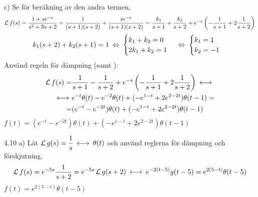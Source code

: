 \begin{task}{c)}
	Se  för beräkning av den andra termen.
	\[\operatorname{\mathcal{L}} f(s)=\frac{1+se^{-s}}{s^2+3s+2}=\frac{1}{(s+1)(s+2)}+\frac{se^{-s}}{(s+1)(s+2)}=\frac{k_1}{s+1}+\frac{k_2}{s+2}+e^{-s}\left(-\frac{1}{s+1}+2\frac{1}{s+2}\right)\]
	\[k_1(s+2)+k_2(s+1)=1\lra
	\begin{cases}
	k_1+k_2=0 \\
	2k_1+k_2=1
	\end{cases}\lra
	\begin{cases}
	k_1=1 \\
	k_2=-1
	\end{cases}\]
	Använd regeln för dämpning (samt ):
	\begin{align*}
	\laplace f(s)=
	&\frac{1}{s+1}-\frac{1}{s+2}+e^{-s}\left(-\frac{1}{s+1}+2\frac{1}{s+2}\right)\llra \\ \llra
	&e^{-t}\theta(t)-e^{-2}\theta(t)+(-e^{1-t}+2e^{2-2t})\theta(t-1)= \\ =
	&(e^{-t}-e^{-2t})\theta(t)+(-e^{1-t}+2e^{2-2t})\theta(t-1)
	\end{align*}
	\ans $f(t)=(e^{-t}-e^{-2t})\theta(t)+(-e^{1-t}+2e^{2-2t})\theta(t-1)$
\end{task}

\begin{task}{4.10 a)}
	Låt $\laplace g(s)=\dfrac{1}{s}\llra\theta(t)$ och använd reglerna för dämpning och förskjutning.
	\[\laplace f(s)=e^{-5s}\frac{1}{s+2}=e^{-5s}\laplace g(s+2) \llra e^{-2(t-5)}g(t-5)=e^{2(5-t)}\theta(t-5)\]
	\ans $f(t)=e^{2(5-t)}\theta(t-5)$
\end{task}